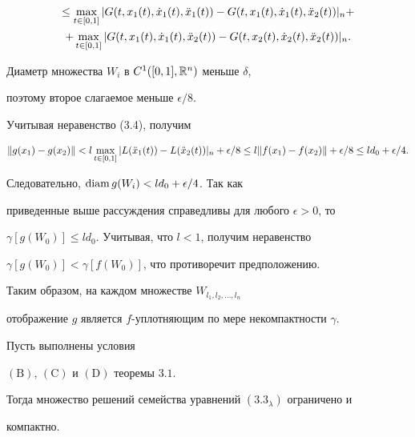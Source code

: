 \begin{pf}
\begin{pf}
\begin{multline*}
%


\leq \max\limits_{t\in [0,1]} |G(t, x_1(t), \Dot x_1(t), 


\Ddot x_1(t)) - G(t, x_1(t), \Dot x_1(t), 


\Ddot x_2(t))|_n + \\


%


+\max\limits_{t\in [0,1]} |G(t, x_1(t), \Dot x_1(t), 


\Ddot x_2 (t)) - G(t, x_2(t), \Dot x_2(t), 


\Ddot x_2 (t))|_n.


\end{multline*}


Диаметр множества $W_i$ в $C^1([0,1], {\Bbb R}^n)$ меньше $\delta$,


поэтому второе слагаемое меньше $\epsilon /8$.


Учитывая неравенство (3.4), получим 


$$


\|g(x_1) - g(x_2)\| < l \max\limits_{t\in [0,1]}


|L(\Ddot x_1(t))- L(\Ddot x_2(t))|_n + \epsilon /8 \leq 


l\|f(x_1) - f(x_2)\| + \epsilon / 8 \leq l d_0 + \epsilon / 4.


$$


Следовательно, $\operatorname{diam} g(W_i) < l d_0 + \epsilon /4$. Так как


приведенные выше рассуждения справедливы для любого $\epsilon >0$, то 


$\gamma [g(W_0)]\leq l d_0$. Учитывая, что $l<1$, получим неравенство


$\gamma [g(W_0)] < \gamma [f(W_0)]$, что противоречит предположению.


Таким образом, на каждом множестве $W_{l_1, l_2, \dotsc, l_n}$


отображение $g$ является $f$-уплотняющим по мере некомпактности $\gamma$.


\end{pf}





\begin{lems}


Пусть выполнены условия


$\mathrm{(B)}$, $\mathrm{(C)}$ и $\mathrm{(D)}$ теоремы $3.1$.


Тогда множество решений семейства уравнений $(3.3_\lambda)$ ограничено и


компактно.



\end{lems}
\end{pf}
